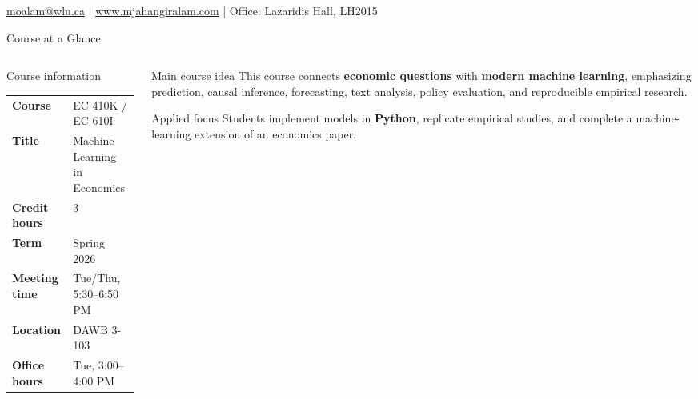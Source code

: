 \documentclass[aspectratio=169,11pt]{beamer}
\title[Machine Learning in Economics]{\course}
\subtitle{Course Outline Slides \; | \; Spring 2026}
\author{\instructor}
\institute{Wilfrid Laurier University}
\date{}
\newcommand{\smallgap}{\vspace{0.35em}}
\begin{document}
\begin{frame}[plain]
\titlepage
\vspace{-0.6em}
\begin{center}
\small
\href{mailto:moalam@wlu.ca}{moalam@wlu.ca} \quad | \quad
\href{https://www.mjahangiralam.com}{www.mjahangiralam.com} \quad | \quad
Office: Lazaridis Hall, LH2015
\end{center}
\end{frame}

\begin{frame}{Course at a Glance}
\begin{columns}[T,onlytextwidth]
\begin{column}{0.49\textwidth}
\begin{block}{Course information}
\begin{tabular}{@{}ll@{}}
\textbf{Course} & EC 410K / EC 610I \\
\textbf{Title} & Machine Learning in Economics \\
\textbf{Credit hours} & 3 \\
\textbf{Term} & Spring 2026 \\
\textbf{Meeting time} & Tue/Thu, 5:30--6:50 PM \\
\textbf{Location} & DAWB 3-103 \\
\textbf{Office hours} & Tue, 3:00--4:00 PM \\
\end{tabular}
\end{block}
\end{column}
\begin{column}{0.49\textwidth}
\begin{block}{Main course idea}
This course connects \textbf{economic questions} with \textbf{modern machine learning}, emphasizing prediction, causal inference, forecasting, text analysis, policy evaluation, and reproducible empirical research.
\end{block}
\smallgap
\begin{block}{Applied focus}
Students implement models in \textbf{Python}, replicate empirical studies, and complete a machine-learning extension of an economics paper.
\end{block}
\end{column}
\end{columns}
\end{frame}
\end{document}
